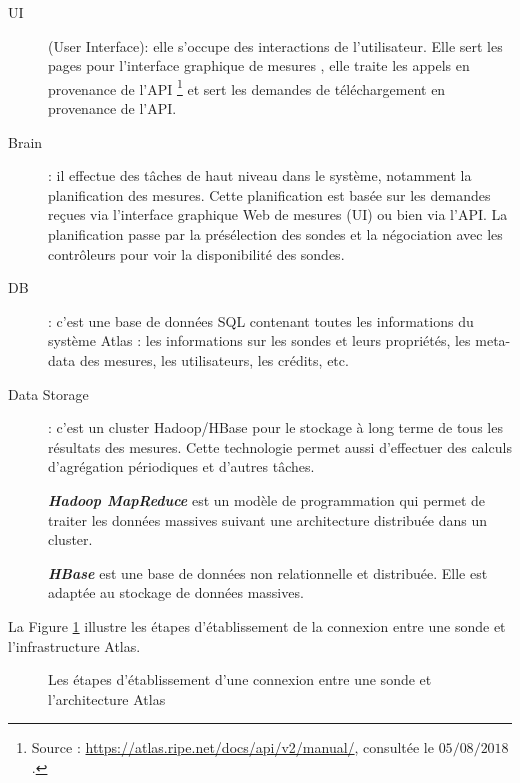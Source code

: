 \begin{description}
	
	
	\item [UI] (User Interface): elle s'occupe des interactions de l'utilisateur. Elle sert les pages pour l'interface graphique de mesures \cite{create-UDM}, elle traite les appels en provenance de l'API \footnote{Source : \url{https://atlas.ripe.net/docs/api/v2/manual/}, consultée le $05/08/2018$.} et sert les demandes de téléchargement en provenance de l'API.
	
	\item [Brain] : il effectue des tâches de haut niveau dans le système, notamment la planification des mesures. Cette planification est basée sur les demandes reçues via l'interface graphique Web de mesures (UI) ou bien via l'API. La planification passe par la  présélection des sondes  et la négociation avec les contrôleurs pour voir la disponibilité des sondes. 
	
	
	\item [DB] : c'est une base de données SQL contenant toutes les informations du système  Atlas : les informations sur les sondes et leurs propriétés, les meta-data des mesures, les utilisateurs, les crédits, etc. 
	
	\item [Data Storage] : c'est un cluster Hadoop/HBase pour le stockage à long terme de tous les résultats des mesures. Cette technologie permet aussi d'effectuer des calculs d'agrégation périodiques et  d'autres tâches. 
	
	
	\begin{tcolorbox}
		\textbf{\textit{Hadoop MapReduce}} est un modèle de programmation qui permet de traiter les données massives suivant une architecture distribuée dans un cluster.
		
		\textbf{\textit{HBase}} est une base de données non relationnelle et distribuée. Elle est adaptée au stockage de données massives.
	\end{tcolorbox} 
	
\end{description}


La Figure \ref{fig:deroulement-connexion-ripe-atlas} illustre les étapes d'établissement de la connexion entre une sonde   et  l'infrastructure  Atlas.

\begin{figure}[H]
	\captionsetup{justification=centering}
	\centering
	\resizebox{\textwidth}{!}{
		 
	}
	\caption{Les étapes d'établissement d'une connexion entre une sonde  et l'architecture Atlas}
	\label{fig:deroulement-connexion-ripe-atlas}
\end{figure}

